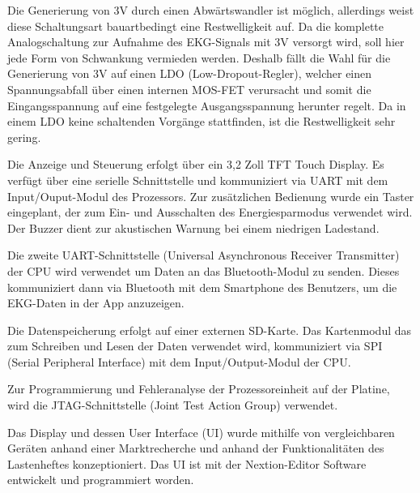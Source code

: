 Die Generierung von 3V durch einen Abwärtswandler ist möglich, allerdings weist diese Schaltungsart bauartbedingt eine Restwelligkeit auf. Da die komplette Analogschaltung zur Aufnahme des EKG-Signals mit 3V versorgt wird, soll hier jede Form von Schwankung vermieden werden.
Deshalb fällt die Wahl für die Generierung von 3V auf einen LDO (Low-Dropout-Regler), welcher einen Spannungsabfall über einen internen MOS-FET verursacht und somit die Eingangsspannung auf eine festgelegte Ausgangsspannung herunter regelt. Da in einem LDO keine schaltenden Vorgänge stattfinden, ist die Restwelligkeit sehr gering.

Die Anzeige und Steuerung erfolgt über ein 3,2 Zoll TFT Touch Display. Es verfügt über eine serielle Schnittstelle und kommuniziert via UART mit dem Input/Ouput-Modul des Prozessors. Zur zusätzlichen Bedienung wurde ein Taster eingeplant, der zum Ein- und Ausschalten des Energiesparmodus verwendet wird. Der Buzzer dient zur akustischen Warnung bei einem niedrigen Ladestand.

Die zweite UART-Schnittstelle (Universal Asynchronous Receiver Transmitter) der CPU wird verwendet um Daten an das Bluetooth-Modul zu senden. Dieses kommuniziert dann via Bluetooth mit dem Smartphone des Benutzers, um die EKG-Daten in der App anzuzeigen.

Die Datenspeicherung erfolgt auf einer externen SD-Karte. Das Kartenmodul das zum Schreiben und Lesen der Daten verwendet wird, kommuniziert via SPI (Serial Peripheral Interface) mit dem Input/Output-Modul der CPU.

Zur Programmierung und Fehleranalyse der Prozessoreinheit auf der Platine, wird die JTAG-Schnittstelle (Joint Test Action Group) verwendet.

Das Display und dessen User Interface (UI) wurde mithilfe von vergleichbaren Geräten anhand einer Marktrecherche und anhand der Funktionalitäten des Lastenheftes konzeptioniert. Das UI ist mit der Nextion-Editor Software entwickelt und programmiert worden.

